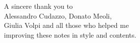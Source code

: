 \documentclass[preview,12pt]{article}
\begin{document}
\phantom{pippo}
\vspace{5cm}
\begin{flushleft}
A sincere thank you to\\
Alessandro Cudazzo, Donato Meoli,\\
Giulia Volpi and all those who helped me\\
improving these notes in style and contents.\\
\end{flushleft}
\newpage

\tableofcontents
\let\tableofcontents\relax
\shipout\null%




\end{document}
